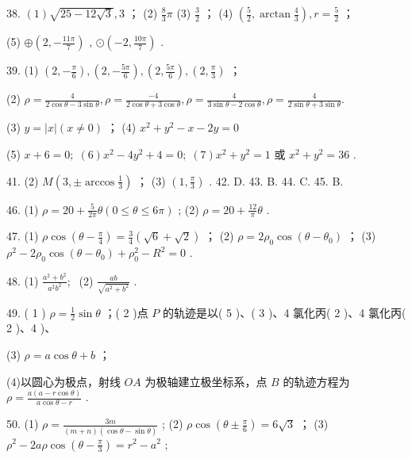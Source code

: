 \documentclass[10pt]{article}
\begin{document}
38. \(\left( 1\right) \sqrt{{25} - {{12}\sqrt{3}}},3\) ； (2) \(\frac{8}{3}\pi\) (3) \(\frac{3}{2}\) ； (4) \(\left( {\frac{5}{2},\arctan \frac{4}{3}}\right) ,r = \frac{5}{2}\) ；

(5) \(\oplus  \left( {2, - \frac{11\pi }{7}}\right)\) , \(\odot  \left( {-2,\frac{10\pi }{7}}\right)\) .

39. (1) \(\left( {2, - \frac{\pi }{6}}\right) ,\left( {2, - \frac{5\pi }{6}}\right) ,\left( {2,\frac{5\pi }{6}}\right) ,\left( {2,\frac{\pi }{3}}\right)\) ；

(2) \(\rho  = \frac{4}{2\cos \theta  - 3\sin \theta },\rho  = \frac{-4}{2\cos \theta  + 3\cos \theta },\rho  = \frac{4}{3\sin \theta  - 2\cos \theta },\rho  = \frac{4}{2\sin \theta  + 3\sin \theta }.\)

(3) \(y = \left| x\right| \left( {x \neq  0}\right)\) ； (4) \({x}^{2} + {y}^{2} - x - {2y} = 0\)

(5) \(x + 6 = 0;\;\left( 6\right) {x}^{2} - 4{y}^{2} + 4 = 0;\;\left( 7\right) {x}^{2} + {y}^{2} = 1\) 或 \({x}^{2} + {y}^{2} = {36}\) .

41. (2) \(M\left( {3, \pm  \arccos \frac{1}{3}}\right)\) ； (3) \(\left( {1,\frac{\pi }{3}}\right)\) . 42. D. 43. B. 44. C. 45. B.

46. (1) \(\rho  = {20} + \frac{5}{2\pi }\theta \left( {0 \leq  \theta  \leq  {6\pi }}\right)\) ; (2) \(\rho  = {20} + \frac{12}{\pi }\theta\) .

47. (1) \(\rho \cos \left( {\theta  - \frac{\pi }{4}}\right)  = \frac{3}{4}\left( {\sqrt{6} + \sqrt{2}}\right)\) ； (2) \(\rho  = 2{\rho }_{0}\cos \left( {\theta  - {\theta }_{0}}\right)\) ； (3) \({\rho }^{2} - 2{\rho }_{0}\cos \left( {\theta  - {\theta }_{0}}\right)  + {\rho }_{0}^{2} - {R}^{2} = 0\) .

48. (1) \(\frac{{a}^{2} + {b}^{2}}{{a}^{2}{b}^{2}};\;\) (2) \(\frac{ab}{\sqrt{{a}^{2} + {b}^{2}}}\) .

49. ( 1 ) \(\rho  = \frac{1}{2}\sin \theta\) ；( 2 )点 \(P\) 的轨迹是以( 5 )、( 3 )、4 氯化丙( 2 )、4 氯化丙( 2 )、4 )、

(3) \(\rho  = a\cos \theta  + b\) ；

(4)以圆心为极点，射线 \({OA}\) 为极轴建立极坐标系，点 \(B\) 的轨迹方程为 \(\rho  = \frac{a\left( {a - r\cos \theta }\right) }{a\cos \theta  - r}\) .

50. (1) \(\rho  = \frac{3m}{\left( {m + n}\right) \left( {\cos \theta  - \sin \theta }\right) }\) ; (2) \(\rho \cos \left( {\theta  \pm  \frac{\pi }{6}}\right)  = 6\sqrt{3}\) ； (3) \({\rho }^{2} - {2a\rho }\cos \left( {\theta  - \frac{\pi }{3}}\right)  = {r}^{2} - {a}^{2}\) ;
\end{document}
